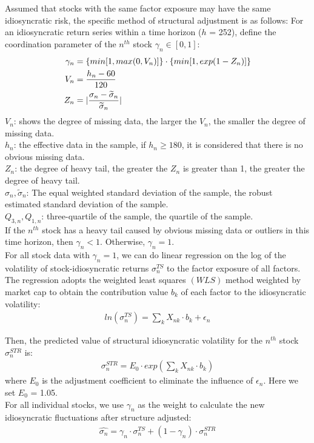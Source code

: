 \documentclass[10pt]{article}
\begin{document}
Assumed that stocks with the same factor exposure may have the same idiosyncratic risk, the specific method of structural adjustment is as follows: For an idiosyncratic return series within a time horizon ($h$ = 252), define the coordination parameter of the $n^{th}$ stock $\gamma_n \in [0,1]$:
\begin{align}
    \gamma_n &=\{min[1,max(0,V_n)]\} \cdot \{min[1,exp(1-Z_n)]\}\\
    V_n &=\frac{h_n-60}{120}\notag \\
    Z_n &=|\frac{\sigma_n-\widetilde\sigma_n}{\widetilde\sigma_n}| \notag
\end{align}
$V_n$: shows the degree of missing data, the larger the $V_n$, the smaller the degree of missing data.\\
$h_n$: the effective data in the sample, if $h_n \geq 180$, it is considered that there is no obvious missing data.\\
$Z_n$: the degree of heavy tail, the greater the $Z_n$ is greater than 1, the greater the degree of heavy tail.\\ 
$\sigma_n, \widetilde\sigma_n$: The equal weighted standard deviation of the sample, the robust estimated standard deviation of the sample.\\
$Q_{3,n}, Q_{1,n}$: three-quartile of the sample, the quartile of the sample.\\
If the $n^{th}$ stock has a heavy tail caused by obvious missing data or outliers in this time horizon, then $\gamma_n < 1$. Otherwise, $\gamma_n = 1$.\\

For all stock data with $\gamma_n = 1$, we can do linear regression on the log of the volatility of stock-idiosyncratic returns $\sigma_n^{TS}$ to the factor exposure of all factors. The regression adopts the weighted least squares $(WLS)$ method weighted by market cap to obtain the contribution value $b_k$ of each factor to the idiosyncratic volatility:
\begin{align}
    ln(\sigma^{TS}_n)=\sum_k X_{nk} \cdot b_k+\epsilon_n
\end{align}

Then, the predicted value of structural idiosyncratic volatility for the $n^{th}$ stock $\sigma_n^{STR}$ is:
\begin{align}
    \sigma_n^{STR}=E_0 \cdot exp(\sum_k X_{nk} \cdot b_k)
\end{align}
where $E_0$ is the adjustment coefficient to eliminate the influence of $\epsilon_n$. Here we set $E_0$ = 1.05.\\
For all individual stocks, we use $\gamma_n$ as the weight to calculate the new idiosyncratic fluctuations after structure adjusted:
\begin{align}
    \hat{\sigma_n}=\gamma_n \cdot \sigma_n^{TS}+(1-\gamma_n)\cdot \sigma_n^{STR}
\end{align}
\end{document}
